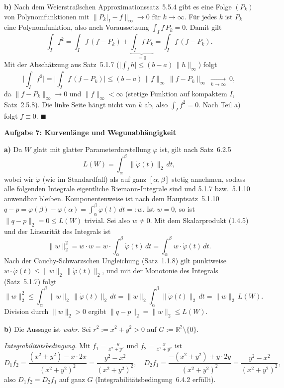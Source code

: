\documentclass[a4paper,12pt]{article}
\providecommand{\qed}{\hfill\ensuremath{\blacksquare}}
\newcommand{\aufgabe}[2]{%
  \bigskip\par\noindent\textbf{Aufgabe #1: #2}\par\nobreak\medskip}
\begin{document}
\textbf{b)} Nach dem Weierstraßschen Approximationssatz~5.5.4 gibt es eine Folge $(P_k)$ von Polynomfunktionen mit $\|P_k|_I-f\|_\infty\to 0$ für $k\to\infty$. Für jedes $k$ ist $P_k$ eine Polynomfunktion, also nach Voraussetzung $\int_I f\,P_k=0$. Damit gilt
\[ \int_I f^2=\int_I f\,(f-P_k)+\underbrace{\int_I f\,P_k}_{=0}=\int_I f\,(f-P_k). \]
Mit der Abschätzung aus Satz~5.1.7 ($\big|\int_I h\big|\le (b-a)\,\|h\|_\infty$) folgt
\[ \Big|\int_I f^2\Big|=\Big|\int_I f\,(f-P_k)\Big|\le (b-a)\,\|f\|_\infty\,\|f-P_k\|_\infty\ \xrightarrow[k\to\infty]{}\ 0, \]
da $\|f-P_k\|_\infty\to 0$ und $\|f\|_\infty<\infty$ (stetige Funktion auf kompaktem $I$, Satz~2.5.8). Die linke Seite hängt nicht von $k$ ab, also $\int_I f^2=0$. Nach Teil a) folgt $f\equiv 0$. \qed

\aufgabe{7}{Kurvenlänge und Wegunabhängigkeit}

\textbf{a)} Da $W$ glatt mit glatter Parameterdarstellung $\varphi$ ist, gilt nach Satz~6.2.5
\[ L(W)=\int_\alpha^\beta \|\dot\varphi(t)\|_2\,dt, \]
wobei wir $\dot\varphi$ (wie im Standardfall) als auf ganz $[\alpha,\beta]$ stetig annehmen, sodass alle folgenden Integrale eigentliche Riemann-Integrale sind und 5.1.7 bzw.\ 5.1.10 anwendbar bleiben. Komponentenweise ist nach dem Hauptsatz~5.1.10 $q-p=\varphi(\beta)-\varphi(\alpha)=\int_\alpha^\beta\dot\varphi(t)\,dt=:w$. Ist $w=0$, so ist $\|q-p\|_2=0\le L(W)$ trivial. Sei also $w\neq 0$. Mit dem Skalarprodukt (1.4.5) und der Linearität des Integrals ist
\[ \|w\|_2^2=w\cdot w=w\cdot\int_\alpha^\beta\dot\varphi(t)\,dt=\int_\alpha^\beta w\cdot\dot\varphi(t)\,dt. \]
Nach der Cauchy-Schwarzschen Ungleichung (Satz~1.1.8) gilt punktweise $w\cdot\dot\varphi(t)\le\|w\|_2\,\|\dot\varphi(t)\|_2$, und mit der Monotonie des Integrals (Satz~5.1.7) folgt
\[ \|w\|_2^2\le\int_\alpha^\beta \|w\|_2\,\|\dot\varphi(t)\|_2\,dt=\|w\|_2\int_\alpha^\beta\|\dot\varphi(t)\|_2\,dt=\|w\|_2\,L(W). \]
Division durch $\|w\|_2>0$ ergibt $\|q-p\|_2=\|w\|_2\le L(W)$.

\textbf{b)} Die Aussage ist \emph{wahr}. Sei $r^2:=x^2+y^2>0$ auf $G:=\mathbb{R}^2\setminus\{0\}$.

\emph{Integrabilitätsbedingung.} Mit $f_1=\tfrac{-y}{x^2+y^2}$ und $f_2=\tfrac{x}{x^2+y^2}$ ist
\[ D_1 f_2=\frac{(x^2+y^2)-x\cdot 2x}{(x^2+y^2)^2}=\frac{y^2-x^2}{(x^2+y^2)^2},\quad
   D_2 f_1=\frac{-(x^2+y^2)+y\cdot 2y}{(x^2+y^2)^2}=\frac{y^2-x^2}{(x^2+y^2)^2}, \]
also $D_1 f_2=D_2 f_1$ auf ganz $G$ (Integrabilitätsbedingung~6.4.2 erfüllt).
\end{document}
